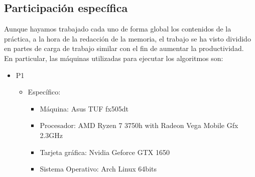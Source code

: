 \documentclass{article}
\begin{document}
    \subsection{Participación específica}
    Aunque hayamos trabajado cada uno de forma global los contenidos de la práctica, a la hora de la redacción de la memoria, el trabajo se ha visto dividido en partes de carga de trabajo similar con el fin de aumentar la productividad.
    \\
    En particular, las máquinas utilizadas para ejecutar los algoritmos son:
    \begin{itemize}
        \item P1
        \begin{itemize}
            \item Específico: \begin{itemize}
                \item Máquina: Asus TUF fx505dt
                \item Procesador: AMD Ryzen 7 3750h with Radeon Vega Mobile Gfx 2.3GHz
                \item Tarjeta gráfica: Nvidia Geforce GTX 1650
                \item Sistema Operativo: Arch Linux 64bits


\end{itemize}
\end{itemize}
\end{itemize}
\end{document}
